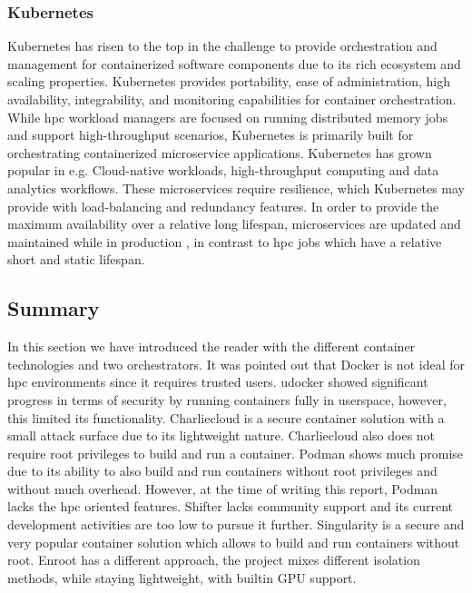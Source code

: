 \documentclass[12pt]{article}
\begin{document}
\subsubsection{Kubernetes}
Kubernetes has risen to the top in the challenge to provide orchestration and management for containerized software components due to its rich ecosystem and scaling properties. Kubernetes provides portability, ease of administration, high availability, integrability, and monitoring capabilities for container orchestration. While \gls{hpc} workload managers are focused on running distributed memory jobs and support high-throughput scenarios, Kubernetes is primarily built for orchestrating containerized microservice applications. Kubernetes has grown popular in e.g. Cloud-native workloads, high-throughput computing and data analytics workflows. These microservices require resilience, which Kubernetes may provide with load-balancing and redundancy features. In order to provide the maximum availability over a relative long lifespan, microservices are updated and maintained while in production \cite{hpc-kubernetes-containers}, in contrast to \gls{hpc} jobs which have a relative short and static lifespan.


\subsection{Summary}
In this section we have introduced the reader with the different container technologies and two orchestrators. It was pointed out that Docker is not ideal for \gls{hpc} environments since it requires trusted users. udocker showed significant progress in terms of security by running containers fully in userspace, however, this limited its functionality. Charliecloud is a secure container solution with a small attack surface due to its lightweight nature. Charliecloud also does not require root privileges to build and run a container. Podman shows much promise due to its ability to also build and run containers without root privileges and without much overhead. However, at the time of writing this report, Podman lacks the \gls{hpc} oriented features. Shifter lacks community support and its current development activities are too low to pursue it further. Singularity is a secure and very popular container solution which allows to build and run containers without root. Enroot has a different approach, the project mixes different isolation methods, while staying lightweight, with builtin GPU support.
\end{document}
